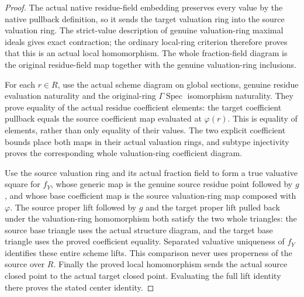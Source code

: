 \begin{proof}
The actual native residue-field embedding preserves every value by the
native pullback definition, so it sends the target valuation ring into
the source valuation ring. The strict-value description of genuine
valuation-ring maximal ideals gives exact contraction; the ordinary
local-ring criterion therefore proves that this is an actual local
homomorphism. The whole fraction-field diagram is the original
residue-field map together with the genuine valuation-ring inclusions.

For each $r\in R$, use the actual scheme diagram on global sections,
genuine residue evaluation naturality and the original-ring
$\Gamma\operatorname{Spec}$ isomorphism naturality. They prove equality
of the actual residue coefficient elements: the target coefficient
pullback equals the source coefficient map evaluated at $\varphi(r)$.
This is equality of elements, rather than only equality of their values.
The two explicit coefficient bounds place both maps in their actual
valuation rings, and subtype injectivity proves the corresponding whole
valuation-ring coefficient diagram.

Use the source valuation ring and its actual fraction field to form a
true valuative square for $f_Y$, whose generic map is the genuine source
residue point followed by $g$, and whose base coefficient map is the
source valuation-ring map composed with $\varphi$. The source proper
lift followed by $g$ and the target proper lift pulled back under the
valuation-ring homomorphism both satisfy the two whole triangles: the
source base triangle uses the actual structure diagram, and the target
base triangle uses the proved coefficient equality. Separated valuative
uniqueness of $f_Y$ identifies these entire scheme lifts. This comparison
never uses properness of the source over $R$. Finally the proved local
homomorphism sends the actual source closed point to the actual target
closed point. Evaluating the full lift identity there proves the stated
center identity.
\end{proof}

